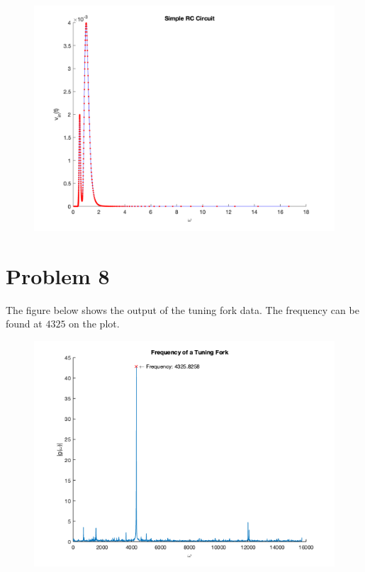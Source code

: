 \documentclass[12pt]{article}
\begin{document}
\begin{figure}[h!]
    \centering
    {{\includegraphics[width=15cm]{v_in.png}}}%
    \qquad
    \caption{ }%
    \label{fig:example}%
\end{figure}

\newpage

\section*{Problem 8}

The figure below shows the output of the tuning fork data. The frequency can be found at $4325$ on the plot.

\begin{figure}[h!]
    \centering
    {{\includegraphics[width=15cm]{tuning_fork.png}}}%
    \qquad
    \caption{ }%
    \label{fig:example}%
\end{figure}
\end{document}
